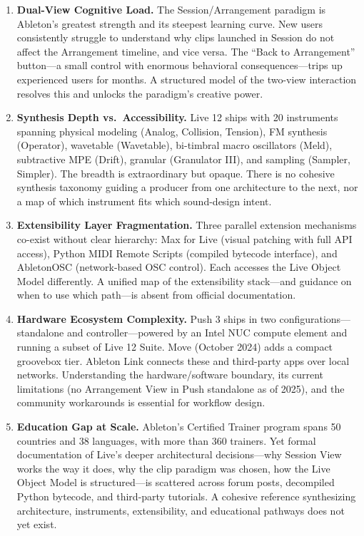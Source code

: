 \documentclass[11pt,letterpaper]{article}
\begin{document}
\begin{enumerate}
  \item \textbf{Dual-View Cognitive Load.} The Session/Arrangement paradigm is Ableton's
  greatest strength and its steepest learning curve. New users consistently struggle to
  understand why clips launched in Session do not affect the Arrangement timeline, and
  vice versa. The ``Back to Arrangement'' button---a small control with enormous behavioral
  consequences---trips up experienced users for months. A structured model of the
  two-view interaction resolves this and unlocks the paradigm's creative power.

  \item \textbf{Synthesis Depth vs.\ Accessibility.} Live 12 ships with 20 instruments spanning
  physical modeling (Analog, Collision, Tension), FM synthesis (Operator), wavetable
  (Wavetable), bi-timbral macro oscillators (Meld), subtractive MPE (Drift), granular
  (Granulator III), and sampling (Sampler, Simpler). The breadth is extraordinary but
  opaque. There is no cohesive synthesis taxonomy guiding a producer from one architecture
  to the next, nor a map of which instrument fits which sound-design intent.

  \item \textbf{Extensibility Layer Fragmentation.} Three parallel extension mechanisms
  co-exist without clear hierarchy: Max for Live (visual patching with full API access),
  Python MIDI Remote Scripts (compiled bytecode interface), and AbletonOSC (network-based
  OSC control). Each accesses the Live Object Model differently. A unified map of the
  extensibility stack---and guidance on when to use which path---is absent from official
  documentation.

  \item \textbf{Hardware Ecosystem Complexity.} Push 3 ships in two configurations---standalone
  and controller---powered by an Intel NUC compute element and running a subset of Live 12
  Suite. Move (October 2024) adds a compact groovebox tier. Ableton Link connects these and
  third-party apps over local networks. Understanding the hardware/software boundary, its
  current limitations (no Arrangement View in Push standalone as of 2025), and the
  community workarounds is essential for workflow design.

  \item \textbf{Education Gap at Scale.} Ableton's Certified Trainer program spans 50 countries
  and 38 languages, with more than 360 trainers. Yet formal documentation of Live's deeper
  architectural decisions---why Session View works the way it does, why the clip paradigm
  was chosen, how the Live Object Model is structured---is scattered across forum posts,
  decompiled Python bytecode, and third-party tutorials. A cohesive reference synthesizing
  architecture, instruments, extensibility, and educational pathways does not yet exist.
\end{enumerate}
\end{document}
